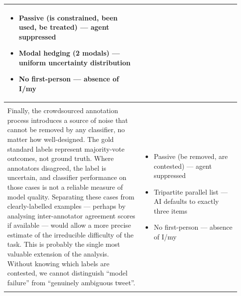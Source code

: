 \documentclass[11pt]{article}
\begin{document}
\begin{longtable}{|p{0.55\linewidth}|p{0.40\linewidth}|}
\begin{itemize}[leftmargin=1em,itemsep=1pt,topsep=1pt,parsep=0pt]
  \item Passive (is constrained, been used, be treated) --- agent suppressed
  \item Modal hedging (2 modals) --- uniform uncertainty distribution
  \item No first-person --- absence of I/my
\end{itemize} \\[2pt]
\hline
\rule{0pt}{3.5cm} & \\
\hline
Finally, the crowdsourced annotation process introduces a source of noise that cannot be removed by any classifier, no matter how well-designed. The gold standard labels represent majority-vote outcomes, not ground truth. Where annotators disagreed, the label is uncertain, and classifier performance on those cases is not a reliable measure of model quality. Separating these cases from clearly-labelled examples --- perhaps by analysing inter-annotator agreement scores if available --- would allow a more precise estimate of the irreducible difficulty of the task. This is probably the single most valuable extension of the analysis. Without knowing which labels are contested, we cannot distinguish ``model failure'' from ``genuinely ambiguous tweet''. & \begin{itemize}[leftmargin=1em,itemsep=1pt,topsep=1pt,parsep=0pt]
  \item Passive (be removed, are contested) --- agent suppressed
  \item Tripartite parallel list --- AI defaults to exactly three items
  \item No first-person --- absence of I/my
\end{itemize} \\[2pt]
\hline
\rule{0pt}{3.5cm} & \\
\hline
\end{longtable}
\end{document}
